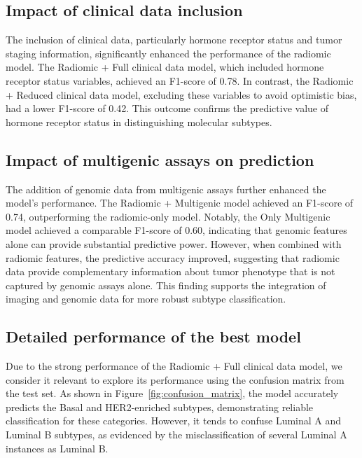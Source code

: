 \documentclass[conference]{IEEEtran}
\begin{document}
\subsection{Impact of clinical data inclusion}

The inclusion of clinical data, particularly hormone receptor status and tumor staging information, significantly enhanced the performance of the radiomic model. The Radiomic + Full clinical data model, which included hormone receptor status variables, achieved an F1-score of 0.78. In contrast, the Radiomic + Reduced clinical data model, excluding these variables to avoid optimistic bias, had a lower F1-score of 0.42. This outcome confirms the predictive value of hormone receptor status in distinguishing molecular subtypes.

\subsection{Impact of multigenic assays on prediction}

The addition of genomic data from multigenic assays further enhanced the model’s performance. The Radiomic + Multigenic model achieved an F1-score of 0.74, outperforming the radiomic-only model. Notably, the Only Multigenic model achieved a comparable F1-score of 0.60, indicating that genomic features alone can provide substantial predictive power. However, when combined with radiomic features, the predictive accuracy improved, suggesting that radiomic data provide complementary information about tumor phenotype that is not captured by genomic assays alone. This finding supports the integration of imaging and genomic data for more robust subtype classification.

\subsection{Detailed performance of the best model}

Due to the strong performance of the Radiomic + Full clinical data model, we consider it relevant to explore its performance using the confusion matrix from the test set. As shown in Figure~\ref{fig:confusion_matrix}, the model accurately predicts the Basal and HER2-enriched subtypes, demonstrating reliable classification for these categories. However, it tends to confuse Luminal A and Luminal B subtypes, as evidenced by the misclassification of several Luminal A instances as Luminal B.
\end{document}
